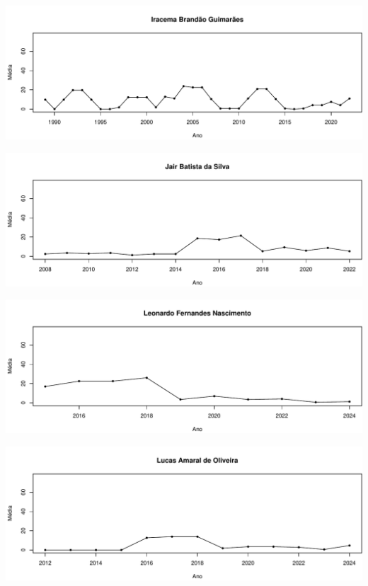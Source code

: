 \documentclass[12pt,brazil]{article}\usepackage[]{graphicx}\usepackage[]{xcolor}
\makeatletter
\def\maxwidth{ %
  \ifdim\Gin@nat@width>\linewidth
    \linewidth
  \else
    \Gin@nat@width
  \fi
}
\makeatother
\begin{document}
\vspace{0.5cm}


{\centering \includegraphics[width=\maxwidth]{figure/mediamovel-10} 

}



\vspace{0.5cm}


{\centering \includegraphics[width=\maxwidth]{figure/mediamovel-11} 

}



\vspace{0.5cm}


{\centering \includegraphics[width=\maxwidth]{figure/mediamovel-12} 

}



\vspace{0.5cm}


{\centering \includegraphics[width=\maxwidth]{figure/mediamovel-13} 

}
\end{document}
